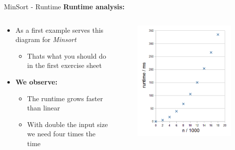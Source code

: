 
\begin{frame}{MinSort - Runtime}
  \textbf{Runtime analysis:}
  \vspace{-0.5em}
  \begin{columns}%
    \begin{column}[t]{0.5\textwidth}%
      \begin{itemize}
        \item
          As a first example serves this diagram for \textit{Minsort}
          \begin{itemize}
            \item
              Thats what you should do in the first exercise sheet
          \end{itemize}
        \item<2- |handout:1>
          \textbf{We observe:}\\
          \begin{itemize}
            \item
              The runtime {\color{Mittel-Blau}grows faster than linear}
            \item
              With double the input size we need four times the time
          \end{itemize}
      \end{itemize}
    \end{column}%
    \begin{column}[t]{0.45\textwidth}%
      \begin{center}%
        \begin{figure}[!h]%
          \includegraphics[width=\textwidth]{Images/MinSort/Minsort.png}%

\end{figure}
\end{center}
\end{column}
\end{columns}
\end{frame}

